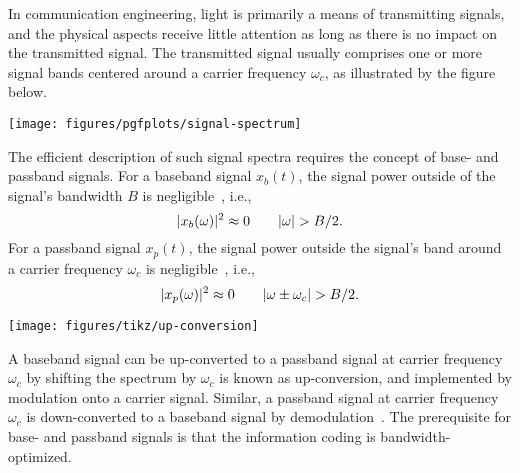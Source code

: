 In communication engineering, light is primarily a means of transmitting signals, and the physical aspects receive little attention as long as there is no impact on the transmitted signal.
The transmitted signal usually comprises one or more signal bands centered around a carrier frequency $\omega_c$, as illustrated by the figure below.
\begin{figure*}[htb]
	\centering
	\texttt{[image: figures/pgfplots/signal-spectrum]}
	\caption*{Receiver spectrum comprising multiple signal bands relative to a carrier frequency at $\omega=0$. At \SI{+100}{\mega\hertz}, the spectrum has a pilot tone broadened by phase noise. Centered at \SI{-25}{\mega\hertz}, the spectrum contains a first signal band with \SI{12.5}{\mega\hertz} bandwidth. Centered at \SI{-168.75}{\mega\hertz}, the spectrum contains a second signal band with \SI{12.5}{\mega\hertz} bandwidth. The remaining segments of the spectrum include mirror bands or disturbances.}
\end{figure*}
The efficient description of such signal spectra requires the concept of base- and passband signals.
For a baseband signal $x_b(t)$, the signal power outside of the signal's bandwidth $B$ is negligible~\cite[p.~15]{Madhow2008}, i.e.,
\begin{equation*}
	\lvert x_b(\omega)\rvert^2
	\approx
	0
	\qquad
	\lvert\omega\rvert
	>
	B/2
	.
\end{equation*}
For a passband signal $x_p(t)$, the signal power outside the signal's band around a carrier frequency $\omega_c$ is negligible~\cite[p.~16]{Madhow2008}, i.e.,
\begin{equation*}
	\lvert x_p(\omega)\rvert^2
	\approx
	0
	\qquad
	\lvert\omega\pm\omega_c\rvert
	>
	B/2
	.	
\end{equation*}
\begin{figure*}[htb]
	\centering
	\texttt{[image: figures/tikz/up-conversion]}
	\caption*{Power spectrum illustrating up-conversion of a real-valued passband signal with bandwidth $B$ centered at $\omega_0$. Up-conversion by $\omega_c$ shifts the passband to $\omega_c+\omega_0$ and creates a mirror band at $\omega_c-\omega_0$.}
\end{figure*}
A baseband signal can be up-converted to a passband signal at carrier frequency $\omega_c$ by shifting the spectrum by $\omega_c$ is known as up-conversion, and implemented by modulation onto a carrier signal.
Similar, a passband signal at carrier frequency $\omega_c$ is down-converted to a baseband signal by demodulation~\cite[p.~26]{Madhow2008}.
The prerequisite for base- and passband signals is that the information coding is bandwidth-optimized.



